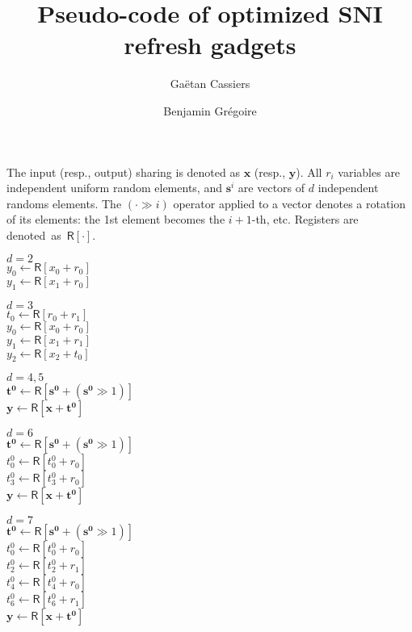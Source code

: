 \documentclass{article}
\title{Pseudo-code of optimized SNI refresh gadgets}
\author{Gaëtan Cassiers \and Benjamin Grégoire}
\date{}
\newcommand{\reg}[1]{\mathsf{R}\left[#1\right]}
\newcommand{\vect}[1]{\mathbf{#1}}
\begin{document}
\maketitle

The input (resp., output) sharing is denoted as $\vect{x}$ (resp., $\vect{y}$).
All $r_i$ variables are independent uniform random elements, and $\vect{s}^i$
are vectors of $d$ independent randoms elements.
The $(\cdot \gg i)$ operator applied to a vector denotes a rotation of its
elements: the 1st element becomes the $i+1$-th, etc.
Registers are denoted~as~$\reg{\cdot}$.

\setlength{\columnsep}{0.1cm}
\begin{multicols}{3}
    \footnotesize{
        {\centering $d=2$\\}
        \noindent
        $y_0 \leftarrow \reg{x_0 + r_0}$ \\
        $y_1 \leftarrow \reg{x_1 + r_0}$

        {\centering $d=3$\\}
        \noindent
        $t_0 \leftarrow \reg{r_0 + r_1}$ \\
        $y_0 \leftarrow \reg{x_0 + r_0}$ \\
        $y_1 \leftarrow \reg{x_1 + r_1}$ \\
        $y_2 \leftarrow \reg{x_2 + t_0}$

        {\centering $d=4,5$ \\}
        \noindent
        $\vect{t^0} \leftarrow \reg{\vect{s^0} + (\vect{s^0} \gg 1)}$ \\
        $\vect{y} \leftarrow \reg{\vect{x} + \vect{t^0}}$

        {\centering $d=6$\\}
        \noindent
        $\vect{t^0} \leftarrow \reg{\vect{s^0} + (\vect{s^0} \gg 1)}$ \\
        $t^0_0 \leftarrow \reg{t^0_0 + r_0}$ \\
        $t^0_3 \leftarrow \reg{t^0_3 + r_0}$ \\
        $\vect{y} \leftarrow \reg{\vect{x} + \vect{t^0}}$

        {\centering $d=7$\\}
        \noindent
        $\vect{t^0} \leftarrow \reg{\vect{s^0} + (\vect{s^0} \gg 1)}$ \\
        $t^0_0 \leftarrow \reg{t^0_0 + r_0}$ \\
        $t^0_2 \leftarrow \reg{t^0_2 + r_1}$ \\
        $t^0_4 \leftarrow \reg{t^0_4 + r_0}$ \\
        $t^0_6 \leftarrow \reg{t^0_6 + r_1}$ \\
        $\vect{y} \leftarrow \reg{\vect{x} + \vect{t^0}}$

}
\end{multicols}
\end{document}
